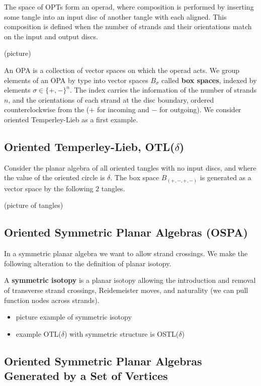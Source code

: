 \documentclass[11pt]{article} %
\begin{document}
The space of OPTs form an operad, where composition is performed by inserting some tangle into an input disc of another tangle with each \marker \hspace{1mm}aligned. This composition is defined when the number of strands and their orientations match on the input and output discs.

(picture)
  
An OPA is a collection of vector spaces on which the operad acts. We group elements of an OPA by type into vector spaces $B_\sigma$ called \textbf{box spaces}, indexed by elements $\sigma \in \{+,-\}^n$. The index carries the information of the number of strands $n$, and the orientations of each strand at the disc boundary, ordered counterclockwise from the \marker \hspace{1mm}($+$ for incoming and $-$ for outgoing). We consider oriented Temperley-Lieb as a first example.

\subsection{Oriented Temperley-Lieb, OTL($\delta$)}

Consider the planar algebra of all oriented tangles with no input discs, and where the value of the oriented circle is $\delta$. The box space $B_{(+,-,+,-)}$ is generated as a vector space by the following $2$ tangles.

(picture of tangles)

\subsection{Oriented Symmetric Planar Algebras (OSPA)}
In a symmetric planar algebra we want to allow strand crossings. We make the following alteration to the definition of planar isotopy.
\begin{mydef}
A \textbf{symmetric isotopy} is a planar isotopy allowing the introduction and removal of transverse strand crossings, Reidemeister moves, and naturality (we can pull function nodes across strands).
\end{mydef}

\begin{itemize}
\item picture example of symmetric isotopy
\item example OTL($\delta$) with symmetric structure is OSTL($\delta$)
\end{itemize}

\subsection{Oriented Symmetric Planar Algebras Generated by a Set of Vertices}
\end{document}
